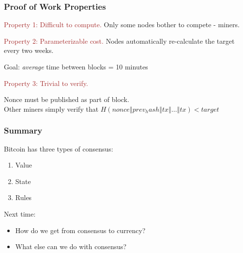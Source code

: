 \documentclass{beamer}
\begin{document}
\begin{frame}
  \frametitle{Proof of Work Properties}
       \begin{block}{\textcolor{brown}{ Property 1: Difficult to compute.}}
       Only some nodes bother to compete - miners.
 	\end{block} 

	\pause
	
	\begin{block}{\textcolor{brown}{ Property 2: Parameterizable cost.}}
       Nodes automatically re-calculate the target every two weeks. \\
       \pause
       
Goal: \emph{average} time between blocks = 10 minutes

 	\end{block} 
 	
 	\pause
 	
 		\begin{block}{\textcolor{brown}{ Property 3: Trivial to verify.}}
       
Nonce must be published as part of block. \\


Other miners simply verify that
$H(nonce ‖ prev_hash ‖ tx ‖ … ‖ tx) < target$

 	\end{block} 
\end{frame}
\begin{frame}
  \frametitle{Summary}
  Bitcoin has three types of consensus: 
	\begin{enumerate}
		\item Value
		\item State
		\item Rules
	\end{enumerate}
	\pause
  Next time:
	\begin{itemize}
		\item How do we get from consensus to currency?
		\item What else can we do with consensus?
    \end{itemize}		
\end{frame}
\end{document}
